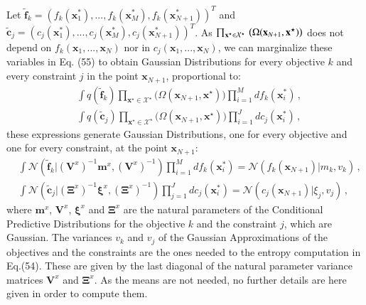 \documentclass[review,preprint,12pt]{elsarticle}
\begin{document}
Let $\tilde{\boldsymbol{f}}_k = (f_k(\boldsymbol{x}_1^*),...,f_k(\boldsymbol{x}_M^*),f_k(\boldsymbol{x}_{N+1}^*))^T$ and $\tilde{\boldsymbol{c}}_j = (c_j(\boldsymbol{x}_1^*),...,c_j(\boldsymbol{x}_M^*),c_j(\boldsymbol{x}_{N+1}^*))^T$. As $\prod_{\textbf{x}^\star\in \mathcal{X}^\star} \\
	\left(  
	\Omega(\textbf{x}_{N+1},\textbf{x}^{\star})
	\right)$ does not depend on $f_k(\boldsymbol{x}_1,...,\boldsymbol{x}_N)$ nor in $c_j(\boldsymbol{x}_1,...,\boldsymbol{x}_N)$, we can marginalize these variables in Eq. (55) to obtain Gaussian Distributions for every objective $k$ and every constraint $j$ in the point $\boldsymbol{x}_{N+1}$, proportional to:
\begin{align}
    & \int q(\tilde{\boldsymbol{f}}_k) \prod_{\textbf{x}^\star\in \mathcal{X}^\star} 
	\Bigg( \Omega(\textbf{x}_{N+1},\textbf{x}^{\star}) \Bigg) \prod_{i=1}^{M} df_k(\boldsymbol{x}_i^*) \,, \\
	& \int q(\tilde{\boldsymbol{c}}_j) \prod_{\textbf{x}^\star\in \mathcal{X}^\star} 
	\Bigg( \Omega(\textbf{x}_{N+1},\textbf{x}^{\star}) \Bigg) \prod_{i=1}^{J} dc_j(\boldsymbol{x}_i^*) \,, 
\end{align}
these expressions generate Gaussian Distributions, one for every objective and one for every constraint, at the point $\boldsymbol{x}_{N+1}$:
\begin{align}
	& \int \mathcal{N}(\tilde{\boldsymbol{f}}_k|(\boldsymbol{V}^x)^{-1}\boldsymbol{m}^x,(\boldsymbol{V}^x)^{-1})\prod_{i=1}^{M} df_k(\boldsymbol{x}_i^*) = \mathcal{N}(f_k(\boldsymbol{x}_{N+1})|m_k,v_k)\,, \\
	& \int \mathcal{N}(\tilde{\boldsymbol{c}}_j|(\boldsymbol{\Xi}^x)^{-1}\boldsymbol{\xi}^x,(\boldsymbol{\Xi}^x)^{-1}) \prod_{j=1}^{J}  dc_j(\boldsymbol{x}_i^*) = \mathcal{N}(c_j(\boldsymbol{x}_{N+1})|\xi_j,v_j)\,,
\end{align}
where $\boldsymbol{m}^x$, $\boldsymbol{V}^x$, $\boldsymbol{\xi}^x$ and $\boldsymbol{\Xi}^x$ are the natural parameters of the Conditional Predictive Distributions for the objective $k$ and the constraint $j$, which are Gaussian. The variances $v_k$ and $v_j$ of the Gaussian Approximations of the objectives and the constraints are the ones needed to the entropy computation in Eq.(54). These are given by the last diagonal of the natural parameter variance matrices $\boldsymbol{V}^x$ and $\boldsymbol{\Xi}^x$. As the means are not needed, no further details are here given in order to compute them.
\end{document}
